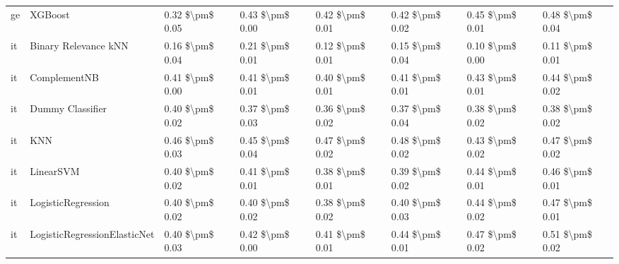 \begin{tabular}{llllllll}
      ge &                         XGBoost & 0.32 \$\textbackslash pm\$ 0.05 &           0.43 \$\textbackslash pm\$ 0.00 &       0.42 \$\textbackslash pm\$ 0.01 &        0.42 \$\textbackslash pm\$ 0.02 &                         0.45 \$\textbackslash pm\$ 0.01 &     0.48 \$\textbackslash pm\$ 0.04 \\
      it &            Binary Relevance kNN & 0.16 \$\textbackslash pm\$ 0.04 &           0.21 \$\textbackslash pm\$ 0.01 &       0.12 \$\textbackslash pm\$ 0.01 &        0.15 \$\textbackslash pm\$ 0.04 &                         0.10 \$\textbackslash pm\$ 0.00 &     0.11 \$\textbackslash pm\$ 0.01 \\
      it &                    ComplementNB & 0.41 \$\textbackslash pm\$ 0.00 &           0.41 \$\textbackslash pm\$ 0.01 &       0.40 \$\textbackslash pm\$ 0.01 &        0.41 \$\textbackslash pm\$ 0.01 &                         0.43 \$\textbackslash pm\$ 0.01 &     0.44 \$\textbackslash pm\$ 0.02 \\
      it &                Dummy Classifier & 0.40 \$\textbackslash pm\$ 0.02 &           0.37 \$\textbackslash pm\$ 0.03 &       0.36 \$\textbackslash pm\$ 0.02 &        0.37 \$\textbackslash pm\$ 0.04 &                         0.38 \$\textbackslash pm\$ 0.02 &     0.38 \$\textbackslash pm\$ 0.02 \\
      it &                             KNN & 0.46 \$\textbackslash pm\$ 0.03 &           0.45 \$\textbackslash pm\$ 0.04 &       0.47 \$\textbackslash pm\$ 0.02 &        0.48 \$\textbackslash pm\$ 0.02 &                         0.43 \$\textbackslash pm\$ 0.02 &     0.47 \$\textbackslash pm\$ 0.02 \\
      it &                       LinearSVM & 0.40 \$\textbackslash pm\$ 0.02 &           0.41 \$\textbackslash pm\$ 0.01 &       0.38 \$\textbackslash pm\$ 0.01 &        0.39 \$\textbackslash pm\$ 0.02 &                         0.44 \$\textbackslash pm\$ 0.01 &     0.46 \$\textbackslash pm\$ 0.01 \\
      it &              LogisticRegression & 0.40 \$\textbackslash pm\$ 0.02 &           0.40 \$\textbackslash pm\$ 0.02 &       0.38 \$\textbackslash pm\$ 0.02 &        0.40 \$\textbackslash pm\$ 0.03 &                         0.44 \$\textbackslash pm\$ 0.02 &     0.47 \$\textbackslash pm\$ 0.01 \\
      it &    LogisticRegressionElasticNet & 0.40 \$\textbackslash pm\$ 0.03 &           0.42 \$\textbackslash pm\$ 0.00 &       0.41 \$\textbackslash pm\$ 0.01 &        0.44 \$\textbackslash pm\$ 0.01 &                         0.47 \$\textbackslash pm\$ 0.02 &     0.51 \$\textbackslash pm\$ 0.02 \\

\end{tabular}
